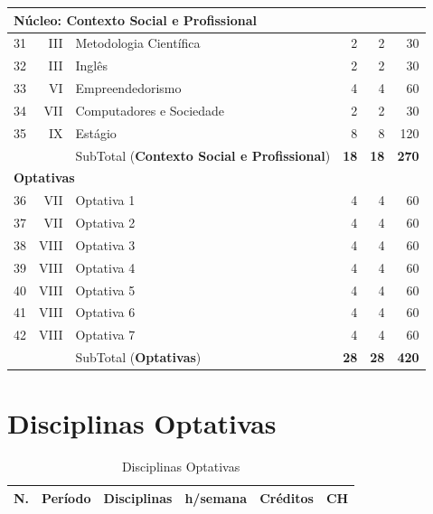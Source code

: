 \documentclass[
	12pt,				%
	openright,			%
  oneside,     %
	a4paper,			%
	chapter=TITLE,		%
	english,			%
	french,				%
	spanish,			%
	brazil				%
	]{abntex2}
\begin{document}
\begin{apendicesenv}
\begin{longtable}{r|r|l|r|r|r}
\multicolumn{6}{l}{Núcleo: \textbf{Contexto Social e Profissional}}\\     \hline
    31    & III   & Metodologia Científica & 2     & 2     & 30 \\     \hline
    32    & III   & Inglês & 2     & 2     & 30 \\    \hline
    33    & VI    & Empreendedorismo & 4     & 4     & 60 \\    \hline
    34    & VII  & Computadores e Sociedade & 2     & 2     & 30 \\ \hline
    35    & IX  & Estágio & 8     & 8     & 120 \\           \hline
          &       & SubTotal (\textbf{Contexto Social e Profissional}) & \textbf{18}    & \textbf{18}    & \textbf{270} \\    \hline
\multicolumn{6}{l}{\textbf{Optativas}} \\ \hline
    36    & VII   & Optativa 1 & 4     & 4     & 60 \\ \hline
    37    & VII   & Optativa 2 & 4     & 4     & 60 \\ \hline
    38    & VIII  & Optativa 3 & 4     & 4     & 60 \\ \hline
    39    & VIII  & Optativa 4 & 4     & 4     & 60 \\ \hline
    40    & VIII  & Optativa 5 & 4     & 4     & 60 \\ \hline
    41    & VIII  & Optativa 6 & 4     & 4     & 60 \\ \hline
    42    & VIII  & Optativa 7 & 4     & 4     & 60 \\ \hline
    \textbf{} & \textbf{} & SubTotal (\textbf{Optativas}) & \textbf{28} & \textbf{28} & \textbf{420} \\ \hline
\end{longtable}%


\chapter{Disciplinas Optativas}

\begin{longtable}{r|r|l|r|r|r}
     \caption{Disciplinas Optativas}
     \label{ltab:teste}
     \\
\hline
    N.    & Período & Disciplinas                       & h/semana & Créditos & CH \\ \hline


\end{longtable}
\end{apendicesenv}
\end{document}
